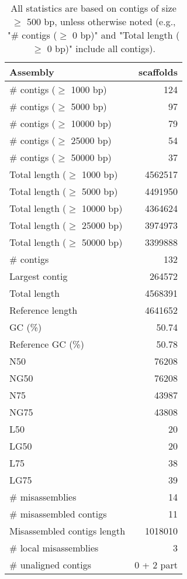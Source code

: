 \documentclass[12pt,a4paper]{article}
\begin{document}
\begin{table}[ht]
\begin{center}
\caption{All statistics are based on contigs of size $\geq$ 500 bp, unless otherwise noted (e.g., "\# contigs ($\geq$ 0 bp)" and "Total length ($\geq$ 0 bp)" include all contigs).}
\begin{tabular}{|l*{1}{|r}|}
\hline
Assembly & scaffolds \\ \hline
\# contigs ($\geq$ 1000 bp) & 124 \\ \hline
\# contigs ($\geq$ 5000 bp) & 97 \\ \hline
\# contigs ($\geq$ 10000 bp) & 79 \\ \hline
\# contigs ($\geq$ 25000 bp) & 54 \\ \hline
\# contigs ($\geq$ 50000 bp) & 37 \\ \hline
Total length ($\geq$ 1000 bp) & 4562517 \\ \hline
Total length ($\geq$ 5000 bp) & 4491950 \\ \hline
Total length ($\geq$ 10000 bp) & 4364624 \\ \hline
Total length ($\geq$ 25000 bp) & 3974973 \\ \hline
Total length ($\geq$ 50000 bp) & 3399888 \\ \hline
\# contigs & 132 \\ \hline
Largest contig & 264572 \\ \hline
Total length & 4568391 \\ \hline
Reference length & 4641652 \\ \hline
GC (\%) & 50.74 \\ \hline
Reference GC (\%) & 50.78 \\ \hline
N50 & 76208 \\ \hline
NG50 & 76208 \\ \hline
N75 & 43987 \\ \hline
NG75 & 43808 \\ \hline
L50 & 20 \\ \hline
LG50 & 20 \\ \hline
L75 & 38 \\ \hline
LG75 & 39 \\ \hline
\# misassemblies & 14 \\ \hline
\# misassembled contigs & 11 \\ \hline
Misassembled contigs length & 1018010 \\ \hline
\# local misassemblies & 3 \\ \hline
\# unaligned contigs & 0 + 2 part \\ \hline

\end{tabular}
\end{center}
\end{table}
\end{document}
